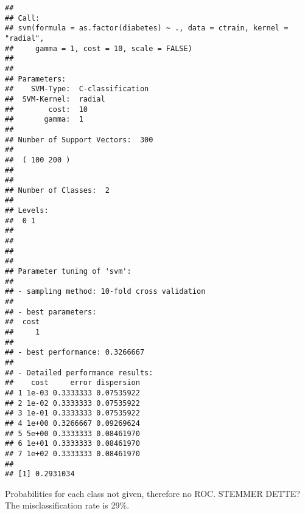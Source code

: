 \documentclass[]{article}
\begin{document}
\begin{verbatim}
## 
## Call:
## svm(formula = as.factor(diabetes) ~ ., data = ctrain, kernel = "radial", 
##     gamma = 1, cost = 10, scale = FALSE)
## 
## 
## Parameters:
##    SVM-Type:  C-classification 
##  SVM-Kernel:  radial 
##        cost:  10 
##       gamma:  1 
## 
## Number of Support Vectors:  300
## 
##  ( 100 200 )
## 
## 
## Number of Classes:  2 
## 
## Levels: 
##  0 1
## 
## 
## 
## 
## Parameter tuning of 'svm':
## 
## - sampling method: 10-fold cross validation 
## 
## - best parameters:
##  cost
##     1
## 
## - best performance: 0.3266667 
## 
## - Detailed performance results:
##    cost     error dispersion
## 1 1e-03 0.3333333 0.07535922
## 2 1e-02 0.3333333 0.07535922
## 3 1e-01 0.3333333 0.07535922
## 4 1e+00 0.3266667 0.09269624
## 5 5e+00 0.3333333 0.08461970
## 6 1e+01 0.3333333 0.08461970
## 7 1e+02 0.3333333 0.08461970
## 
## [1] 0.2931034
\end{verbatim}

Probabilities for each class not given, therefore no ROC. STEMMER DETTE?
The misclassification rate is 29\%.
\end{document}
